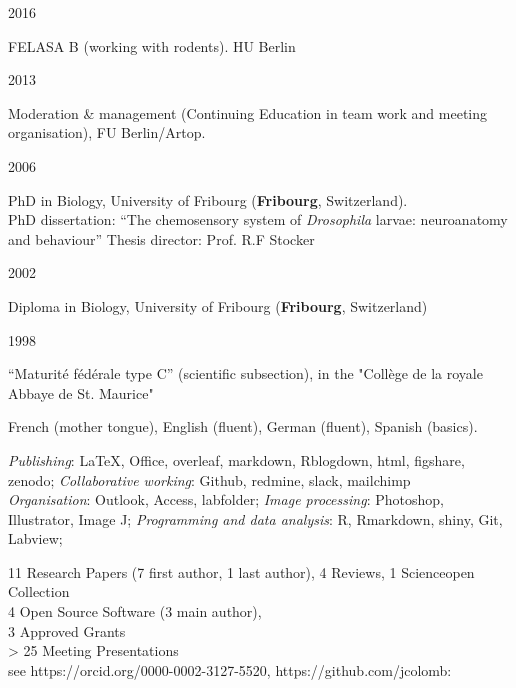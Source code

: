         
\parbox{0.15\textwidth}{2016}\hfill
\parbox[t]{0.83\textwidth}{FELASA B (working with rodents). HU Berlin
        }
\parbox{0.15\textwidth}{2013}\hfill
\parbox[t]{0.83\textwidth}{Moderation \& management (Continuing Education in team work and meeting organisation), FU Berlin/Artop.
        }
\parbox{0.15\textwidth}{2006}\hfill
\parbox[t]{0.83\textwidth}{PhD in Biology,
        University of Fribourg (\textbf{Fribourg}, Switzerland).\\
        PhD dissertation: ``The chemosensory system of \textit{Drosophila} larvae: neuroanatomy and behaviour''
        Thesis director: Prof. R.F Stocker}
\parbox{0.15\textwidth}{2002}\hfill
\parbox[t]{0.83\textwidth}{Diploma in Biology,
        University of Fribourg (\textbf{Fribourg}, Switzerland)
        }
\parbox{0.15\textwidth}{1998}\hfill
\parbox[t]{0.83\textwidth}{``Maturit\'e f\'ed\'erale type C'' (scientific subsection),
in the "Coll\`ege de la royale Abbaye de St. Maurice"}

 French (mother tongue), English (fluent),
German (fluent), Spanish (basics).

\emph{Publishing}: \LaTeX, Office, overleaf, markdown, Rblogdown, html, figshare, zenodo;
\emph{Collaborative working}:  Github, redmine, slack, mailchimp\\
\emph{Organisation}: Outlook, Access, labfolder;
\emph{Image processing}: Photoshop, Illustrator, Image J; 
\emph{Programming and data analysis}:  R, Rmarkdown, shiny, Git, Labview;


%
11 Research Papers (7 first author, 1 last author), 4 Reviews, 1 Scienceopen Collection\\
 4 Open Source Software (3 main author), \\
 3 Approved Grants \\
 > 25 Meeting Presentations \\
 see https://orcid.org/0000-0002-3127-5520, https://github.com/jcolomb: %






